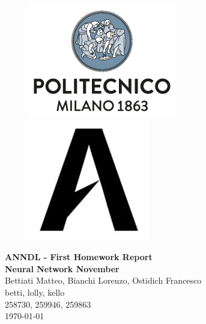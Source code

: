 \documentclass[11pt]{article}
\begin{document}
    
    \begin{figure}[H]
        \raggedright
        \includegraphics[scale=0.4]{images/polimi.png} \hfill \includegraphics[scale=0.3]{images/airlab.jpeg}
    \end{figure}
    
    \vspace{5mm}
    
    \begin{center}
        {\Large \textbf{ANNDL - First Homework Report}}\\
        \vspace{2mm}
        {\Large \textbf{Neural Network November}}\\
        \vspace{2mm}
        {\large Bettiati Matteo,}
        {\large Bianchi Lorenzo,}
        {\large Ostidich Francesco}\\
        \vspace{2mm}
        {betti,}
        {lolly,}
        {kello}\\
        \vspace{2mm}
        {258730,}
        {259946,}
        {259863}\\
        \vspace{5mm}
        \today
    \end{center}    
    \vspace{5mm}
\end{document}
